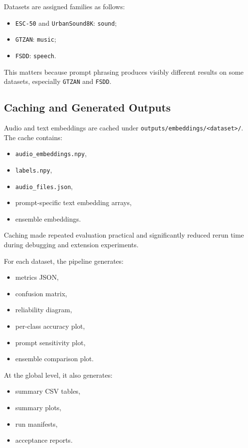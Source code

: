 \documentclass[11pt]{article}
\newcommand{\dataset}[1]{\texttt{#1}}
\begin{document}
Datasets are assigned families as follows:
\begin{itemize}[leftmargin=1.25em]
  \item \dataset{ESC-50} and \dataset{UrbanSound8K}: \dataset{sound};
  \item \dataset{GTZAN}: \dataset{music};
  \item \dataset{FSDD}: \dataset{speech}.
\end{itemize}

This matters because prompt phrasing produces visibly different results on some
datasets, especially \dataset{GTZAN} and \dataset{FSDD}.

\subsection{Caching and Generated Outputs}

Audio and text embeddings are cached under
\dataset{outputs/embeddings/<dataset>/}. The cache contains:
\begin{itemize}[leftmargin=1.25em]
  \item \dataset{audio\_embeddings.npy},
  \item \dataset{labels.npy},
  \item \dataset{audio\_files.json},
  \item prompt-specific text embedding arrays,
  \item ensemble embeddings.
\end{itemize}

Caching made repeated evaluation practical and significantly reduced rerun time
during debugging and extension experiments.

For each dataset, the pipeline generates:
\begin{itemize}[leftmargin=1.25em]
  \item metrics JSON,
  \item confusion matrix,
  \item reliability diagram,
  \item per-class accuracy plot,
  \item prompt sensitivity plot,
  \item ensemble comparison plot.
\end{itemize}

At the global level, it also generates:
\begin{itemize}[leftmargin=1.25em]
  \item summary CSV tables,
  \item summary plots,
  \item run manifests,
  \item acceptance reports.
\end{itemize}
\end{document}
